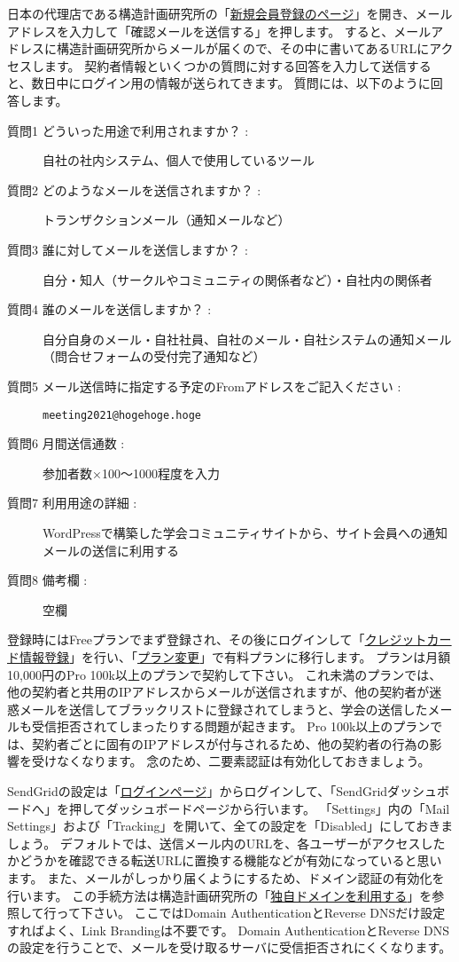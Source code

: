 \documentclass[titlepage,10pt,a4paper,uplatex]{jsbook}
\begin{document}
日本の代理店である構造計画研究所の「\href{https://sendgrid.kke.co.jp/app?p=signup.index}{新規会員登録のページ}」を開き、メールアドレスを入力して「確認メールを送信する」を押します。
すると、メールアドレスに構造計画研究所からメールが届くので、その中に書いてあるURLにアクセスします。
契約者情報といくつかの質問に対する回答を入力して送信すると、数日中にログイン用の情報が送られてきます。
質問には、以下のように回答します。

\begin{description}
\item[質問1 どういった用途で利用されますか？ : ] 自社の社内システム、個人で使用しているツール
\item[質問2 どのようなメールを送信されますか？ : ] トランザクションメール（通知メールなど）
\item[質問3 誰に対してメールを送信しますか？ : ] 自分・知人（サークルやコミュニティの関係者など）・自社内の関係者
\item[質問4 誰のメールを送信しますか？ : ] 自分自身のメール・自社社員、自社のメール・自社システムの通知メール（問合せフォームの受付完了通知など）
\item[質問5 メール送信時に指定する予定のFromアドレスをご記入ください : ] \texttt{meeting2021@hogehoge.hoge}
\item[質問6 月間送信通数 : ] 参加者数×100～1000程度を入力
\item[質問7 利用用途の詳細 : ] WordPressで構築した学会コミュニティサイトから、サイト会員への通知メールの送信に利用する
\item[質問8 備考欄 : ] 空欄
\end{description}

登録時にはFreeプランでまず登録され、その後にログインして「\href{https://sendgrid.kke.co.jp/app?p=mypage.creditcard}{クレジットカード情報登録}」を行い、「\href{https://sendgrid.kke.co.jp/app?p=mypage.plan}{プラン変更}」で有料プランに移行します。
プランは月額10,000円のPro 100k以上のプランで契約して下さい。
これ未満のプランでは、他の契約者と共用のIPアドレスからメールが送信されますが、他の契約者が迷惑メールを送信してブラックリストに登録されてしまうと、学会の送信したメールも受信拒否されてしまったりする問題が起きます。
Pro 100k以上のプランでは、契約者ごとに固有のIPアドレスが付与されるため、他の契約者の行為の影響を受けなくなります。
念のため、二要素認証は有効化しておきましょう。

SendGridの設定は「\href{https://sendgrid.kke.co.jp/app?p=login.index}{ログインページ}」からログインして、「SendGridダッシュボードへ」を押してダッシュボードページから行います。
「Settings」内の「Mail Settings」および「Tracking」を開いて、全ての設定を「Disabled」にしておきましょう。
デフォルトでは、送信メール内のURLを、各ユーザーがアクセスしたかどうかを確認できる転送URLに置換する機能などが有効になっていると思います。
また、メールがしっかり届くようにするため、ドメイン認証の有効化を行います。
この手続方法は構造計画研究所の「\href{https://sendgrid.kke.co.jp/docs/Tutorials/D_Improve_Deliverability/using_whitelabel.html}{独自ドメインを利用する}」を参照して行って下さい。
ここではDomain AuthenticationとReverse DNSだけ設定すればよく、Link Brandingは不要です。
Domain AuthenticationとReverse DNSの設定を行うことで、メールを受け取るサーバに受信拒否されにくくなります。
\end{document}
